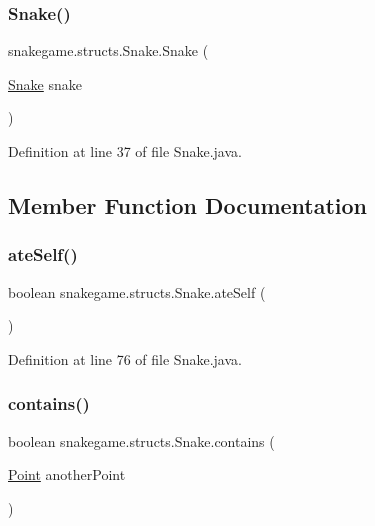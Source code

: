 \subsubsection{\texorpdfstring{Snake()}{Snake()}\hspace{0.1cm}{\footnotesize\ttfamily [3/3]}}
{\footnotesize\ttfamily snakegame.\+structs.\+Snake.\+Snake (\begin{DoxyParamCaption}\item[{\mbox{\hyperlink{classsnakegame_1_1structs_1_1_snake}{Snake}}}]{snake }\end{DoxyParamCaption})}



Definition at line 37 of file Snake.\+java.



\subsection{Member Function Documentation}
\mbox{\label{classsnakegame_1_1structs_1_1_snake_acefd74708c76a65a7e9f8e5182ae3af3}} 
\subsubsection{\texorpdfstring{ate\+Self()}{ateSelf()}}
{\footnotesize\ttfamily boolean snakegame.\+structs.\+Snake.\+ate\+Self (\begin{DoxyParamCaption}{ }\end{DoxyParamCaption})}



Definition at line 76 of file Snake.\+java.

\mbox{\label{classsnakegame_1_1structs_1_1_snake_a3df7436c11ba7bda4154431739778b78}} 
\subsubsection{\texorpdfstring{contains()}{contains()}}
{\footnotesize\ttfamily boolean snakegame.\+structs.\+Snake.\+contains (\begin{DoxyParamCaption}\item[{\mbox{\hyperlink{classsnakegame_1_1structs_1_1_point}{Point}}}]{another\+Point }\end{DoxyParamCaption})}



